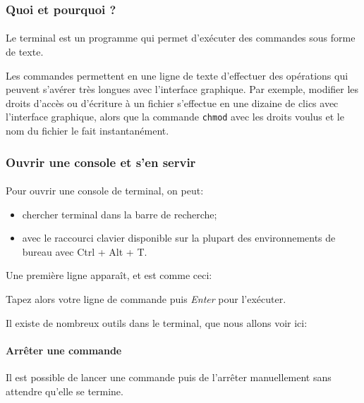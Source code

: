 \subsubsection*{Quoi et pourquoi ?}

\paragraph{} Le terminal est un programme qui permet d'exécuter des commandes
sous forme de texte.

Les commandes permettent en une ligne de texte d'effectuer des
opérations qui peuvent s'avérer très longues avec l'interface graphique. Par
exemple, modifier les droits d'accès ou d'écriture à un fichier s'effectue en
une dizaine de clics avec l'interface graphique, alors que la commande
\texttt{chmod} avec les droits voulus et le nom du fichier le fait
instantanément.

\subsubsection*{Ouvrir une console et s'en servir}

\paragraph{} Pour ouvrir une console de terminal, on peut:

\begin{itemize}
	\item chercher terminal dans la barre de recherche;
	\item avec le raccourci clavier disponible sur la plupart des
		environnements de bureau avec Ctrl + Alt + T.
\end{itemize}

Une première ligne apparaît, et est comme ceci:


Tapez alors votre ligne de commande puis \textit{Enter} pour l'exécuter.\newline

Il existe de nombreux outils dans le terminal, que nous allons voir ici:

\paragraph{Arrêter une commande} Il est possible de lancer une commande puis de
l'arrêter manuellement sans attendre qu'elle se termine.


